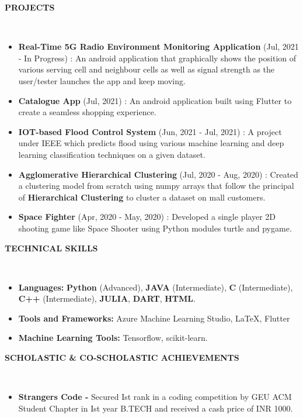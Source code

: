 \documentclass[a4paper,10pt]{article}
\newcommand{\lsep}{-0.5cm}
\newcommand{\resheading}[1]{{\small \colorbox{mygrey}{\begin{minipage}{0.975\textwidth}{\textbf{#1 \vphantom{p\^{E}}}}\end{minipage}}}}
\begin{document}
\resheading{\textbf{PROJECTS} }\\[\lsep]
\begin{itemize}
\setlength\itemsep{0.5em}
\item \textbf{Real-Time 5G Radio Environment Monitoring Application} (Jul, 2021 - In Progress) : An android application that graphically shows the position of various serving cell and neighbour cells as well as signal strength as the user/tester launches the app and keep moving.
\item \textbf{Catalogue App} (Jul, 2021) : An android application built using Flutter to create a seamless shopping experience.
\item \textbf{IOT-based Flood Control System} (Jun, 2021 - Jul, 2021) : A project under IEEE which predicts flood using various machine learning and deep learning classification techniques on a given dataset.
\item \textbf{Agglomerative Hierarchical Clustering} (Jul, 2020 - Aug, 2020) : Created a clustering model from scratch using numpy arrays that follow the principal of \textbf{Hierarchical Clustering} to cluster a dataset on mall customers.
\item \textbf{Space Fighter} (Apr, 2020 - May, 2020) : Developed a single player 2D shooting game like Space Shooter using Python modules turtle and pygame.
\end{itemize}

\resheading{\textbf{TECHNICAL SKILLS} }\\[\lsep]
\begin{itemize}
\setlength\itemsep{0em}
\item \noindent \textbf{Languages:} \textbf{Python} (Advanced), \textbf{JAVA} (Intermediate), \textbf{C} (Intermediate), \textbf{C++} (Intermediate), \textbf{JULIA}, \textbf{DART}, \textbf{HTML}.\\
 \item \noindent\textbf{Tools and Frameworks:} Azure Machine Learning Studio, \LaTeX, Flutter\\
\item \noindent \textbf{Machine Learning Tools:} Tensorflow, scikit-learn.
\end{itemize}

\resheading{\textbf{SCHOLASTIC \& CO-SCHOLASTIC ACHIEVEMENTS} }\\[\lsep]
\begin{itemize}
\setlength\itemsep{0em}
\item \noindent\textbf{Strangers Code - }Secured Ist rank in a coding competition by GEU ACM Student Chapter in Ist year B.TECH and received a cash price of INR 1000.
\end{itemize}
\end{document}
